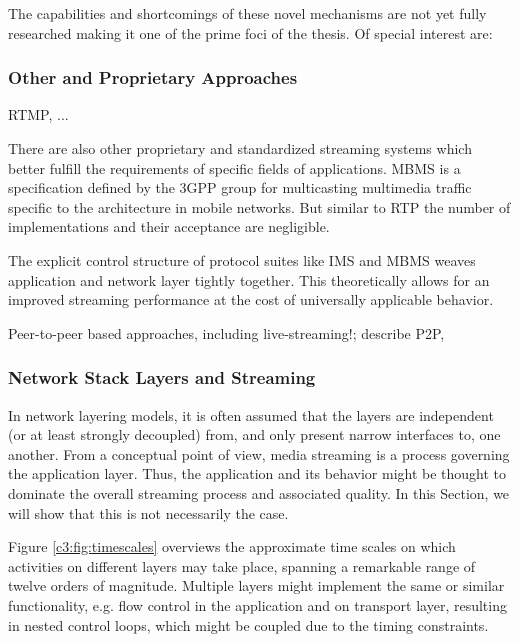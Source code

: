 The capabilities and shortcomings of these novel mechanisms are not yet fully researched making it one of the prime foci of the thesis. Of special interest are:







\subsubsection{Other and Proprietary Approaches}

RTMP, ...

There are also other proprietary and standardized streaming systems which better fulfill the requirements of specific fields of applications. \gls{MBMS} \cite{3gpp22.146,3gpp22.246} is a specification defined by the 3GPP group for multicasting multimedia traffic specific to the architecture in mobile networks. But similar to \gls{RTP} the number of implementations and their acceptance are negligible.

The explicit control structure of protocol suites like \gls{IMS} \cite{3gpp.23.228} and \gls{MBMS} weaves application and network layer tightly together. This theoretically allows for an improved streaming performance at the cost of universally applicable behavior.

Peer-to-peer based approaches, including live-streaming!; describe P2P, 


\subsubsection{Network Stack Layers and Streaming}
\label{sec:analysis}

In network layering models, it is often assumed that the layers are independent (or at least strongly decoupled) from, and only present narrow interfaces to, one another. From a conceptual point of view, media streaming is a process governing the application layer. Thus, the application and its behavior might be thought to dominate the overall streaming process and associated quality. In this Section, we will show that this is not necessarily the case.

Figure \ref{c3:fig:timescales} overviews the approximate time scales on which activities on different layers may take place, spanning a remarkable range of twelve orders of magnitude. Multiple layers might implement the same or similar functionality, e.g. flow control in the application and on transport layer, resulting in nested control loops, which might be coupled due to the timing constraints. 

